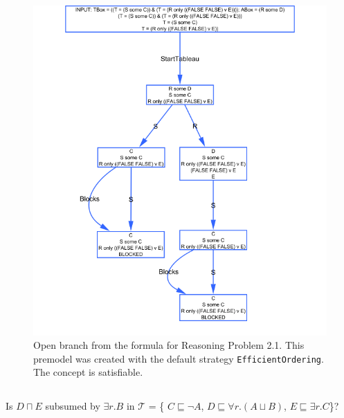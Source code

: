 \documentclass[11pt]{article} %
\begin{document}
\begin{figure}
\begin{center}
\includegraphics[scale=0.4]{premodel21Open.png}
\caption{Open branch from the formula for Reasoning Problem 2.1. This premodel was created with the default strategy \texttt{EfficientOrdering}. The concept is satisfiable.}
\label{fig:21Open}
\end{center}
\end{figure}


\subsection{}

\begin{center}
Is $D \sqcap E$ subsumed by $\exists r.B$ in $\mathcal{T}$ = \{ $C \sqsubseteq \neg A$, $D \sqsubseteq \forall r.(A \sqcup B)$, $E \sqsubseteq \exists r.C$\}?
\end{center}
\end{document}
